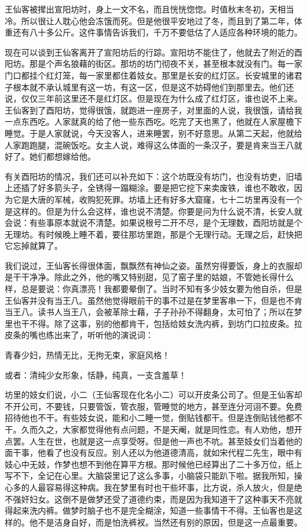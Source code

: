王仙客被撵出宣阳坊时，身上一文不名，而且恍恍惚惚。时值秋末冬初，天相当冷。所以很让人耽心他会冻饿而死。但是他很平安地过了冬，而且到了第二年，体重还有八十多公斤。这件事情告诉我们，千万不要低估了人适应各种环境的能力。 

现在可以谈到王仙客离开了宣阳坊后的行踪。宣阳坊不能住了，他就去了附近的酉阳坊。那是个声名狼藉的街区。那坊的坊门彻夜不关，甚至根本就没有门。每一家门口都挂个红灯笼，每一家里都住着妓女。那里是长安的红灯区。长安城里的诸君子根本就不承认城里有这一坊，有这一区，但是这不妨碍他们到那里去。他们还说，仅仅三年前这里还不是红灯区。但是现在为什么成了红灯区，谁也说不上来。王仙客到了酉阳坊，觉得很饿，就跑进一座房子，对里面的人说，我很饿，请给我一点东西吃。人家就真的给了他一些东西吃。吃完了天也黑了，他就在人家屋檐下睡觉。于是人家就说，今天没客人，进来睡罢，别不好意思。从第二天起，他就给人家跑跑腿，混碗饭吃。女主人说，难得这么体面的一条汉子，要是肯来当王八就好了。她们都想嫁给他。 

有关酉阳坊的情况，我们还可以补充如下：这个坊既没有坊门，也没有坊吏，旧墙上还插了好多箭头子，全锈得一蹋糊涂。要是把它挖下来卖废铁，谁也不敢收，因为它是大唐的军械，收购犯死罪。坊墙上还有好多大窟窿，七十二坊里再没有一个是这样的。但是为什么会这样，谁也说不清楚。你要是问为什么说不清，长安人就会说：有些事原本就说不清楚。如果说根号二开不尽，是个无理数，酉阳坊就是个无理坊。有时候晚上睡不着，要往那坊里跑，那是个无理行动。无理之后，赶快把它忘掉就算了。 

我们说过，王仙客长得很体面，飘飘然有神仙之姿。虽然穷得要饭，身上的衣服却是干干净净。除此之外，他的嘴又特别甜，见了窑子里的姑娘，不管她长得什么样，总是要说：你真漂亮！我都要晕倒了。当时不知有多少妓女要为他自杀，但是王仙客并没有当王八。虽然他觉得眼前干的事不过是在梦里客串一下，但是也不肯当王八。读书人当王八，会被革除士藉，子子孙孙不得翻身，太可怕了；所以在梦里也干不得。除了这事，别的他都肯干，包括给妓女洗内裤，到坊门口拉皮条。拉皮条的嘴也练出来了，听听他的演说词： 

青春少妇，热情无比，无拘无束，家庭风格！ 

或者：清纯少女形象，恬静，纯真，一支含羞草！ 

坊里的妓女们说，小二（王仙客现在化名小二）可以开皮条公司了。但是王仙客却不开公司，不要钱，只要管饭，管衣服，管睡觉的地方，甚至连分河诩不要。免费招待他也不干。有些妓女说，能和小二睡一觉，倒贴钱都干。但是连倒贴钱他都不干。久而久之，大家都觉得他有点问题，不是天阉，就是同性恋。有人劝他，想开点罢。人生在世，也就是这一点享受呀。但是他一声也不吭。甚至妓女们当着他的面干事，他看了也没有反应。别人还以为他道德清高，就如宋代程二先生，眼中有妓心中无妓，作梦也想不到他在算平方根。那时候他已经算出了二十多万位，纸上写不下，全记在心里。大脑袋里记了这么多事，小脑袋只能趴下啦。据我所知，操心多的人最容易得这种病。我在梦里有时也干些坏事，比方说，杀人放火，但是绝不强奸妇女。这倒不是做梦还受了道德约束，而是因为我知道干了这种事天不亮就得起来洗内裤。做梦时脑子也不是完全糊涂，知道一些事情干不得。王仙客也是这样的。他不是洁身自好，而是怕洗裤衩。当然还有别的原因，但是这一点最重要。 

